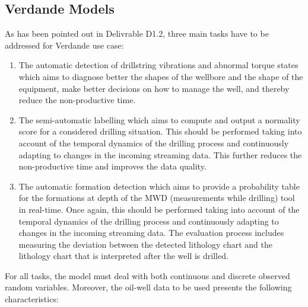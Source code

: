 \subsection{Verdande Models}


As has been pointed out in Delivrable D1.2, three main tasks have to be addressed for Verdande use case:

\begin{enumerate}

\item The automatic detection of drillstring vibrations and abnormal torque states which aims to diagnose better the shapes of the wellbore and the shape of the equipment, make better decisions on how to manage the well, and thereby reduce the non-productive time.

\item The semi-automatic labelling which aims to compute and output a normality score for a considered drilling situation. This should be performed taking into account of the temporal dynamics of the drilling process and continuously adapting to changes in the incoming streaming data. This further reduces the non-productive time and improves the data quality.

\item The automatic formation detection which aims to provide a probability table for the formations at depth of the MWD (measurements while drilling) tool in real-time. Once again, this should be performed taking into account of the temporal dynamics of the drilling process and continuously adapting to changes in the incoming streaming data. The evaluation process includes measuring the deviation between the detected lithology chart and the lithology chart that is interpreted after the well is drilled.

\end{enumerate}

For all tasks, the model must deal with both continuous and discrete observed random variables. Moreover, the oil-well data to be used presents the following characteristics: 

